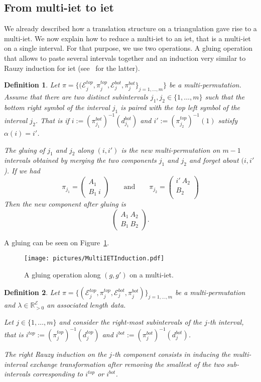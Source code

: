 \documentclass{article}
\def\RR{\mathbb{R}}
\def\cE{\mathcal{E}}
\newtheorem{definition}{Definition}
\begin{document}
\subsection{From multi-iet to iet}
We already described how a translation structure on a triangulation gave rise to a
multi-iet. We now explain how to reduce a multi-iet to an iet, that is
a multi-iet on a single interval. For that purpose, we use two operations.
A gluing operation that allows to paste several
intervals together and an induction very similar to
Rauzy induction for iet (see~\cite{Yoccoz} for the latter).
\begin{definition}
Let
$\pi = \{(\cE^{top}_j, \pi^{top}_j, \cE^{bot}_j, \pi^{bot}_j\}_{j=1,\ldots,m}\}$
be a multi-permutation.
Assume that there are two distinct subintervals $j_1, j_2 \in \{1,\ldots,m\}$ such
that the bottom right symbol of the interval $j_1$ is paired with the top left
symbol of the interval $j_2$. That is if $i := (\pi^{bot}_{j_1})^{-1}(d_{j_1}^{bot})$
and $i' := (\pi^{top}_{j_2})^{-1}(1)$ satisfy $\alpha(i) = i'$.

The \emph{gluing of $j_1$ and $j_2$ along $(i, i')$} is the new multi-permutation
on $m-1$ intervals obtained by merging the two components $j_1$ and $j_2$ and forget
about $(i, i'$). If we had
\[
\pi_{j_1} = \left( \begin{array}{c}
A_1 \\
B_1\ i
\end{array} \right)
\qquad \text{and} \qquad
\pi_{j_2} = \left( \begin{array}{c}
i'\ A_2 \\
B_2 \\
\end{array} \right)
\]
Then the new component after gluing is
\[
\left( \begin{array}{c}
A_1\ A_2 \\
B_1\ B_2
\end{array} \right).
\]
\end{definition}
A gluing can be seen on Figure~\ref{fig:MIETGluing}.
\begin{figure}[!ht]
\begin{center}\texttt{[image: pictures/MultiIETInduction.pdf]}\end{center}
\caption{A gluing operation along $(g,g')$ on a multi-iet.}
\label{fig:MIETGluing}
\end{figure}

\begin{definition}
Let
$\pi = \{(\cE^{top}_j, \pi^{top}_j, \cE^{bot}_j, \pi^{bot}_j)\}_{j=1,\ldots,m}$
be a multi-permutation and $\lambda \in \RR_{>0}^{\cE}$ an associated
length data.

Let $j \in \{1,\ldots,m\}$ and consider the right-most subintervals of
the $j$-th interval, that is $i^{top} := (\pi^{top}_j)^{-1}(d_j^{top})$
and $i^{bot} := (\pi^{bot}_j)^{-1}(d_j^{bot})$.

The \emph{right Rauzy induction on the $j$-th component} consists in inducing
the multi-interval exchange transformation after removing the smallest of
the two sub-intervals corresponding to $i^{top}$ or $i^{bot}$.
\end{definition}
\end{document}
